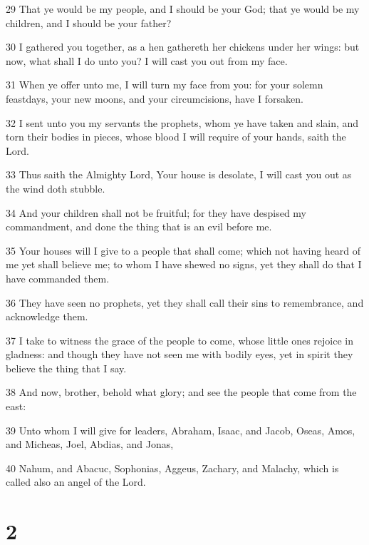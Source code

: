 \par 29 That ye would be my people, and I should be your God; that ye would be my children, and I should be your father?
\par 30 I gathered you together, as a hen gathereth her chickens under her wings: but now, what shall I do unto you? I will cast you out from my face.
\par 31 When ye offer unto me, I will turn my face from you: for your solemn feastdays, your new moons, and your circumcisions, have I forsaken.
\par 32 I sent unto you my servants the prophets, whom ye have taken and slain, and torn their bodies in pieces, whose blood I will require of your hands, saith the Lord.
\par 33 Thus saith the Almighty Lord, Your house is desolate, I will cast you out as the wind doth stubble.
\par 34 And your children shall not be fruitful; for they have despised my commandment, and done the thing that is an evil before me.
\par 35 Your houses will I give to a people that shall come; which not having heard of me yet shall believe me; to whom I have shewed no signs, yet they shall do that I have commanded them.
\par 36 They have seen no prophets, yet they shall call their sins to remembrance, and acknowledge them.
\par 37 I take to witness the grace of the people to come, whose little ones rejoice in gladness: and though they have not seen me with bodily eyes, yet in spirit they believe the thing that I say.
\par 38 And now, brother, behold what glory; and see the people that come from the east:
\par 39 Unto whom I will give for leaders, Abraham, Isaac, and Jacob, Oseas, Amos, and Micheas, Joel, Abdias, and Jonas,
\par 40 Nahum, and Abacuc, Sophonias, Aggeus, Zachary, and Malachy, which is called also an angel of the Lord.

\chapter{2}

